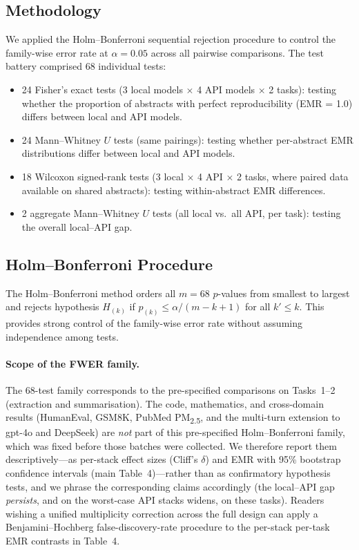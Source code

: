 \documentclass[11pt]{article}
\begin{document}
\subsection{Methodology}

We applied the Holm--Bonferroni sequential rejection procedure to control the family-wise error rate at $\alpha = 0.05$ across all pairwise comparisons. The test battery comprised 68 individual tests:

\begin{itemize}[noitemsep]
    \item 24 Fisher's exact tests (3 local models $\times$ 4 API models $\times$ 2 tasks): testing whether the proportion of abstracts with perfect reproducibility (EMR = 1.0) differs between local and API models.
    \item 24 Mann--Whitney $U$ tests (same pairings): testing whether per-abstract EMR distributions differ between local and API models.
    \item 18 Wilcoxon signed-rank tests (3 local $\times$ 4 API $\times$ 2 tasks, where paired data available on shared abstracts): testing within-abstract EMR differences.
    \item 2 aggregate Mann--Whitney $U$ tests (all local vs.\ all API, per task): testing the overall local--API gap.
\end{itemize}

\subsection{Holm--Bonferroni Procedure}

The Holm--Bonferroni method orders all $m = 68$ $p$-values from smallest to largest and rejects hypothesis $H_{(k)}$ if $p_{(k)} \leq \alpha / (m - k + 1)$ for all $k' \leq k$. This provides strong control of the family-wise error rate without assuming independence among tests.

\paragraph{Scope of the FWER family.}\label{par:fwer-scope}
The 68-test family corresponds to the pre-specified comparisons on Tasks~1--2 (extraction and summarisation). The code, mathematics, and cross-domain results (HumanEval, GSM8K, PubMed PM\textsubscript{2.5}, and the multi-turn extension to gpt-4o and DeepSeek) are \emph{not} part of this pre-specified Holm--Bonferroni family, which was fixed before those batches were collected. We therefore report them descriptively---as per-stack effect sizes (Cliff's $\delta$) and EMR with 95\% bootstrap confidence intervals (main Table~4)---rather than as confirmatory hypothesis tests, and we phrase the corresponding claims accordingly (the local--API gap \emph{persists}, and on the worst-case API stacks widens, on these tasks). Readers wishing a unified multiplicity correction across the full design can apply a Benjamini--Hochberg false-discovery-rate procedure to the per-stack per-task EMR contrasts in Table~4.
\end{document}
